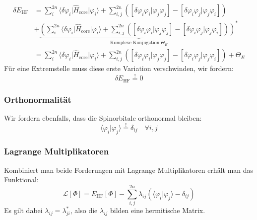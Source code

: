 \begin{equation}\label{E_HF}
  \begin{split}
  \delta E_\textrm{HF} &=
  \sum_i^{2n} \langle \delta \varphi_i \vert \hat{H}_{\text{core}} \vert \varphi_i \rangle
  + \sum_{i, j}^{2n} \left( 
    \left[ \delta \varphi_i \varphi_i \vert \varphi_j \varphi_j \right]
  - \left[ \delta \varphi_i \varphi_j \vert \varphi_j \varphi_i \right]
  \right)\\
  &+ \underbrace{\left( \sum_i^{2n} \langle \delta \varphi_i \vert \hat{H}_{\text{core}} \vert \varphi_i \rangle
  + \sum_{i, j}^{2n} \left( 
    \left[ \delta \varphi_i \varphi_i \vert \varphi_j \varphi_j \right]
  - \left[ \delta \varphi_i \varphi_j \vert \varphi_j \varphi_i \right]
  \right)\right)^*}_\textrm{Komplexe Konjugation $\Theta_E$}\\
  &= 
  \sum_i^{2n} \langle \delta \varphi_i \vert \hat{H}_{\text{core}} \vert \varphi_i \rangle
  + \sum_{i, j}^{2n} \left( 
    \left[ \delta \varphi_i \varphi_i \vert \varphi_j \varphi_j \right]
  - \left[ \delta \varphi_i \varphi_j \vert \varphi_j \varphi_i \right]
  \right) + \Theta_E
  \end{split}
\end{equation}
Für eine Extremstelle muss diese erste Variation verschwinden, wir fordern:
\begin{equation}
  \delta E_\textrm{HF} \overset{!}{=} 0
\end{equation}

\subsubsection*{Orthonormalität}
Wir fordern ebenfalls, dass die Spinorbitale orthonormal bleiben:
\begin{equation}
  \langle \varphi_i \vert \varphi_j \rangle \overset{!}{=} \delta_{ij}\quad \forall i,j
\end{equation}

\subsubsection*{Lagrange Multiplikatoren}
Kombiniert man beide Forderungen mit Lagrange Multiplikatoren erhält man das Funktional:
\begin{equation}
  \mathcal{L}[\Phi] = E_\textrm{HF}[\Phi]
  - \sum_{i,j}^{2n} \lambda_{ij}(\langle \varphi_i \vert \varphi_j \rangle - \delta_{ij})
\end{equation}
Es gilt dabei $\lambda_{ij} = \lambda_{ji}^*$,
also die $\lambda_{ij}$ bilden eine hermitische Matrix. \cite[3.40]{szabo_ostlund_1996}

